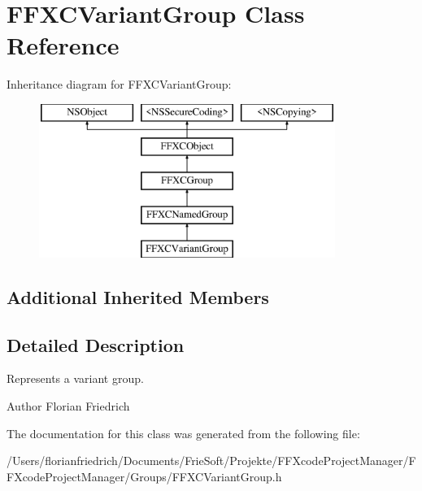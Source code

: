 \hypertarget{interface_f_f_x_c_variant_group}{\section{F\-F\-X\-C\-Variant\-Group Class Reference}
\label{interface_f_f_x_c_variant_group}
}
Inheritance diagram for F\-F\-X\-C\-Variant\-Group\-:\begin{figure}[H]
\begin{center}
\leavevmode
\includegraphics[height=5.000000cm]{interface_f_f_x_c_variant_group}
\end{center}
\end{figure}
\subsection*{Additional Inherited Members}


\subsection{Detailed Description}
Represents a variant group. \begin{DoxyAuthor}{Author}
Florian Friedrich 
\end{DoxyAuthor}


The documentation for this class was generated from the following file\-:\begin{DoxyCompactItemize}
\item 
/\-Users/florianfriedrich/\-Documents/\-Frie\-Soft/\-Projekte/\-F\-F\-Xcode\-Project\-Manager/\-F\-F\-Xcode\-Project\-Manager/\-Groups/F\-F\-X\-C\-Variant\-Group.\-h\end{DoxyCompactItemize}
